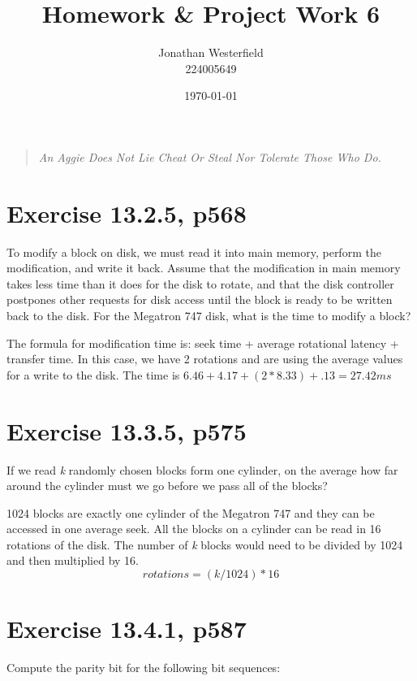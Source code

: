 \documentclass [a4paper,12pt] {article}
\begin{document}
\title{
    \huge{Homework \& Project Work 6}
}
\author{
    Jonathan Westerfield \\
    224005649
}
\date{\today}
\maketitle

\begin{quote} 
\centering 
\textit {
    An Aggie Does Not Lie Cheat Or Steal Nor Tolerate Those Who Do. \\
}
\vspace {1.4in}
\hrulefill
\end{quote}
\newpage

\section {Exercise 13.2.5, p568}
    To modify a block on disk, we must read it into main memory, perform the 
    modification, and write it back. Assume that the modification in main memory 
    takes less time than it does for the disk to rotate, and that the disk 
    controller postpones other requests for disk access until the block is ready
    to be written back to the disk. For the Megatron 747 disk, what is the time
    to modify a block?

    \vspace{.2in}

    The formula for modification time is: seek time + average rotational latency 
    + transfer time. In this case, we have 2 rotations and are using the average 
    values for a write to the disk. The time is 
    \(6.46 + 4.17 + (2 * 8.33) +.13 = 27.42 ms\)
\section{Exercise 13.3.5, p575}
    If we read \textit{k} randomly chosen blocks form one cylinder, on the
    average how far around the cylinder must we go before we pass all of the 
    blocks?

    \vspace{.2in}

    1024 blocks are exactly one cylinder of the Megatron 747 and they can be 
    accessed in one average seek. All the blocks on a cylinder can be read in 
    16 rotations of the disk. The number of \textit{k} blocks would need to be
    divided by 1024 and then multiplied by 16.
    \[rotations = (k / 1024) * 16\]
\section{Exercise 13.4.1, p587}
    Compute the parity bit for the following bit sequences:
\end{document}
